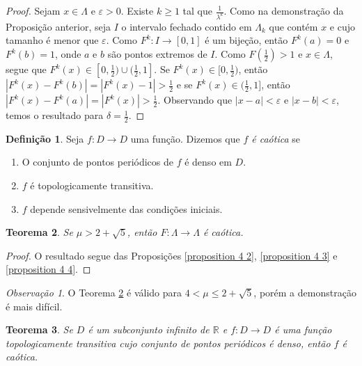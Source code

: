 \documentclass[a4paper, 12pt]{article}
\theoremstyle{definition}
\newtheorem{definition}{Definição}[section]
\theoremstyle{plain}
\theoremstyle{plain}
\theoremstyle{plain}
\newtheorem{theorem}[definition]{Teorema}
\theoremstyle{definition}
\theoremstyle{remark}
\newtheorem*{remark}{Observação}
\newcommand{\RR}{\mathbb{R}}
\begin{document}
\begin{proof}
Sejam $x \in \Lambda$ e $\varepsilon > 0$. Existe $k \geq 1$ tal que $\frac{1}{\lambda^k}$. Como na demonstração da Proposição anterior, seja $I$ o intervalo fechado contido em $\Lambda_k$ que contém $x$ e cujo tamanho é menor que $\varepsilon$. Como $F^k: I \to [0, 1]$ é um bijeção, então $F^k(a) = 0$ e  $F^k(b) = 1$, onde $a$ e $b$ são pontos extremos de $I$. Como $F(\frac{1}{2}) > 1$ e $x \in \Lambda$, segue que $F^{k}(x) \in [0, \frac{1}{2}) \cup (\frac{1}{2}, 1]$. Se $F^{k}(x) \in [0, \frac{1}{2})$, então $|F^k(x) - F^k(b)| = |F^k(x) - 1| > \frac{1}{2}$ e se $F^{k}(x) \in (\frac{1}{2}, 1]$, então $|F^k(x) - F^k(a)| = |F^k(x)| > \frac{1}{2}$. Observando que $|x - a| < \varepsilon$ e  $|x - b| < \varepsilon$, temos o resultado para $\delta = \frac{1}{2}$. 
\end{proof}

\begin{definition}
Seja $f: D \to D$ uma função. Dizemos que \textit{$f$ é caótica} se
\begin{enumerate}
\item O conjunto de pontos periódicos de $f$ é denso em $D$.
\item $f$ é topologicamente transitiva.
\item $f$ depende sensivelmente das condições iniciais.
\end{enumerate}
\end{definition}

\begin{theorem}
\label{theorem 4 2}
Se $\mu > 2 + \sqrt{5}$, então $F: \Lambda \to \Lambda$ é caótica.
\end{theorem}

\begin{proof}
O resultado segue das Proposições \ref{proposition 4 2}, \ref{proposition 4 3} e \ref{proposition 4 4}.
\end{proof}

\begin{remark}
O Teorema \ref{theorem 4 2} é válido para $4 < \mu \leq 2 + \sqrt{5}$, porém a demonstração é mais difícil.
\end{remark}

\begin{theorem}
\label{theorem 4 3}
Se $D$ é um subconjunto infinito de $\RR$ e $f: D \to D$ é uma função topologicamente transitiva cujo conjunto de pontos periódicos é denso, então $f$ é caótica.
\end{theorem}
\end{document}
